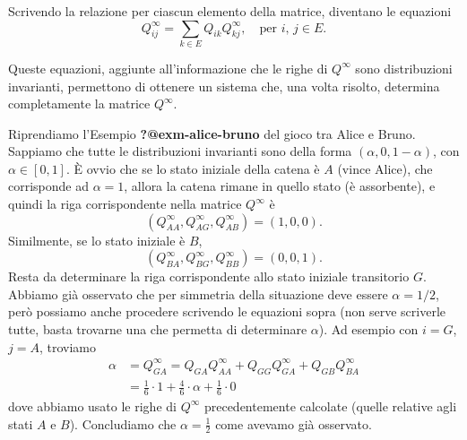 \documentclass[
  italian,
  letterpaper,
]{book}
\theoremstyle{definition}
\theoremstyle{remark}
\begin{document}
Scrivendo la relazione per ciascun elemento della matrice, diventano le
equazioni
\[ Q^{\infty}_{ij} = \sum_{k\in E} Q_{ik} Q^\infty_{kj}, \quad \text{per $i$, $j\in E$.}\]

Queste equazioni, aggiunte all'informazione che le righe di \(Q^\infty\)
sono distribuzioni invarianti, permettono di ottenere un sistema che,
una volta risolto, determina completamente la matrice \(Q^\infty\).

Riprendiamo l'Esempio \textbf{?@exm-alice-bruno} del gioco tra Alice e
Bruno. Sappiamo che tutte le distribuzioni invarianti sono della forma
\((\alpha, 0, 1-\alpha)\), con \(\alpha \in [0,1]\). È ovvio che se lo
stato iniziale della catena è \(A\) (vince Alice), che corrisponde ad
\(\alpha = 1\), allora la catena rimane in quello stato (è assorbente),
e quindi la riga corrispondente nella matrice \(Q^\infty\) è
\[(Q^\infty_{A A}, Q^\infty_{AG}, Q^\infty_{AB}) = (1,0,0).\]
Similmente, se lo stato iniziale è \(B\),
\[(Q^\infty_{B A}, Q^\infty_{BG}, Q^\infty_{BB}) = (0,0,1).\] Resta da
determinare la riga corrispondente allo stato iniziale transitorio
\(G\). Abbiamo già osservato che per simmetria della situazione deve
essere \(\alpha =1/2\), però possiamo anche procedere scrivendo le
equazioni sopra (non serve scriverle tutte, basta trovarne una che
permetta di determinare \(\alpha\)). Ad esempio con \(i= G\), \(j=A\),
troviamo
\[ \begin{split} \alpha & = Q^\infty_{GA} = Q_{GA}Q^{\infty}_{AA} + Q_{GG}Q^{\infty}_{GA} + Q_{GB}Q^{\infty}_{BA}\\
&= \frac 1 6 \cdot 1 + \frac 4 6 \cdot \alpha + \frac 1 6 \cdot 0\end{split}\]
dove abbiamo usato le righe di \(Q^\infty\) precedentemente calcolate
(quelle relative agli stati \(A\) e \(B\)). Concludiamo che
\(\alpha = \frac 1 2\) come avevamo già osservato.
\end{document}
